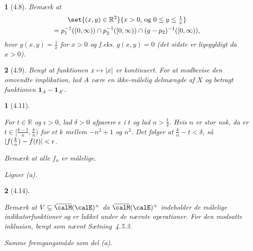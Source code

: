 \documentclass[a4paper, 11pt, article, danish, oneside]{memoir}
\title{\doctitle}
\author{\docauthor}
\newcommand{\overbar}[3]{\mkern #1mu\overline{\mkern-#1mu#3\mkern-#2mu}\mkern #2mu}
\newcommand{\reals}{\mathbb{R}}
\newcommand{\blank}{\mathrel{\;\cdot\;}}
\newcommand{\blankifempty}[1]{\ifstrempty{#1}{\blank}{#1}}
\DeclarePairedDelimiter{\auxdelimlvert}{\lvert}{\rvert}
\newcommand{\abs}[1]{\auxdelimlvert{\blankifempty{#1}}}
\DeclarePairedDelimiter{\auxdelimparen}{(}{)}
\newcommand{\extmeas}[2][]{\overbar{4.5}{0.5}{\calM}\auxdelimparen[#1]{#2}}
\newcommand{\extmeaspos}[2][]{\extmeas[#1]{#2}^+}
\newcommand{\indicator}[1]{\mathbf{1}_{#1}}
\newcommand*\intersect\cap
\newcommand{\preim}[2][]{^{-1}\auxdelimparen[#1]{#2}}
\newcommand{\pencilsymbol}{\raisebox{-2pt}{\normalfont\PencilLeft}}
\theoremstyle{changedotcustomnumber}
\newtheorem{opgave}{\pencilsymbol}
\theoremstyle{changedotbreakcustomnumber}
\newtheorem{opgavebreak}{\pencilsymbol}
\begin{document}
\maketitle


\begin{opgave}[4.8]
    Bemærk at
    \begin{multline*}
        \set{(x,y) \in \reals^2}{x > 0 \text{, og } 0 \leq y \leq \tfrac{1}{x}} \\
            = p_1\preim{(0,\infty)} \intersect p_2\preim{[0,\infty)} \intersect (g-p_2)\preim{[0,\infty)},
    \end{multline*}
    hvor $g(x,y) = \tfrac{1}{x}$ for $x > 0$ og f.eks. $g(x,y) = 0$ (det sidste er ligegyldigt da $x > 0$).
\end{opgave}


\begin{opgave}[4.9]
    Benyt at funktionen $x \mapsto \abs{x}$ er kontinuert. For at modbevise den omvendte implikation, lad $A$ være en ikke-målelig delmængde af $X$ og betragt funktionen $\indicator{A} - \indicator{A^c}$.
\end{opgave}


\begin{opgavebreak}[4.11]
\begin{solutionsec}
    \item For $t \in \reals$ og $\epsilon > 0$, lad $\delta > 0$ afparere $\epsilon$ i $t$ og lad $n > \frac{1}{\delta}$. Hvis $n$ er stor nok, da er $t \in [\tfrac{k-1}{n},\tfrac{k}{n})$ for et $k$ mellem $-n^2+1$ og $n^2$. Det følger at $\tfrac{k}{n} - t < \delta$, så $\abs{f(\tfrac{k}{n}) - f(t)} < \epsilon$.

    \item Bemærk at alle $f_n$ er målelige.

    \item Ligner (a).
\end{solutionsec}
\end{opgavebreak}


\begin{opgavebreak}[4.14]
\begin{solutionsec}
    \item Bemærk at $V \subseteq \extmeaspos{\calE}$ da $\extmeaspos{\calE}$ indeholder de målelige indikatorfunktioner og er lukket under de nævnte operationer. For den modsatte inklusion, benyt som nævnt Sætning~4.5.3.

    \item Samme fremgangsmåde som del (a).
\end{solutionsec}
\end{opgavebreak}
\end{document}
